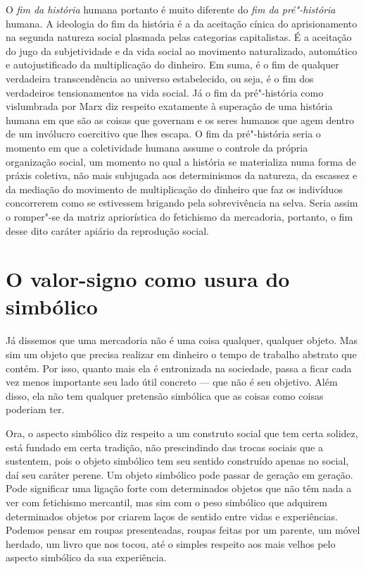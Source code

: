 O \emph{fim da história} humana portanto é muito diferente do \emph{fim
da pré"-história} humana. A ideologia do fim da história é a da aceitação
cínica do aprisionamento na segunda natureza social plasmada pelas
categorias capitalistas. É a aceitação do jugo da subjetividade e da
vida social ao movimento naturalizado, automático e autojustificado da
multiplicação do dinheiro. Em suma, é o fim de qualquer verdadeira
transcendência ao universo estabelecido, ou seja, é o fim dos
verdadeiros tensionamentos na vida social. Já o fim da pré"-história como
vislumbrada por Marx diz respeito exatamente à superação de uma história
humana em que são as coisas que governam e os seres humanos que agem
dentro de um invólucro coercitivo que lhes escapa. O fim da pré"-história
seria o momento em que a coletividade humana assume o controle da
própria organização social, um momento no qual a história se materializa
numa forma de práxis coletiva, não mais subjugada aos determinismos da
natureza, da escassez e da mediação do movimento de multiplicação do
dinheiro que faz os indivíduos concorrerem como se estivessem brigando
pela sobrevivência na selva. Seria assim o romper"-se da matriz
apriorística do fetichismo da mercadoria, portanto, o fim desse dito
caráter apiário da reprodução social.

\section{O valor-signo como usura do simbólico}

Já dissemos que uma mercadoria não é uma coisa qualquer, qualquer
objeto. Mas sim um objeto que precisa realizar em dinheiro o tempo de
trabalho abstrato que contém. Por isso, quanto mais ela é entronizada na
sociedade, passa a ficar cada vez menos importante seu lado útil
concreto --- que não é seu objetivo. Além disso, ela não tem qualquer
pretensão simbólica que as coisas como coisas poderiam ter.

Ora, o aspecto simbólico diz respeito a um construto social que tem
certa solidez, está fundado em certa tradição, não prescindindo das
trocas sociais que a sustentem, pois o objeto simbólico tem seu sentido
construído apenas no social, daí seu caráter perene. Um objeto simbólico
pode passar de geração em geração. Pode significar uma ligação forte com
determinados objetos que não têm nada a ver com fetichismo mercantil,
mas sim com o peso simbólico que adquirem determinados objetos por
criarem laços de sentido entre vidas e experiências. Podemos pensar em
roupas presenteadas, roupas feitas por um parente, um móvel herdado, um
livro que nos tocou, até o simples respeito aos mais velhos pelo aspecto
simbólico da sua experiência.

